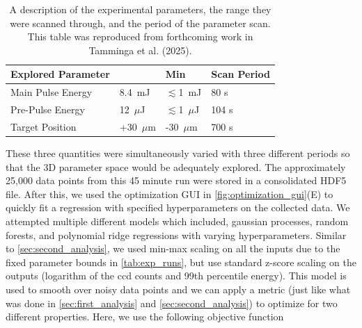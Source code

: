 \begin{table}
	\centering
	\begin{tabular}{|p{4cm}|p{1.5cm}|p{1.5cm}|p{3cm}|}
		\hline
		\textbf{Explored Parameter} & \text{Max} & \textbf{Min} & \textbf{Scan Period}\\
		\hline
		Main Pulse Energy & 8.4~mJ & $\lesssim$1~mJ & 80 s\\
		\hline
		Pre-Pulse Energy & 12~$\mu$J & $\lesssim$1~$\mu$J & 104 s\\
		\hline
		Target Position & +30~$\mu$m & -30~$\mu$m & 700 s\\
		\hline
	\end{tabular}
	\caption{A description of the experimental parameters, the range they were scanned through, and the period of the parameter scan. This table was reproduced from forthcoming work in Tamminga et al. (2025).}
	\label{tab:exp_runs}
\end{table}

These three quantities were simultaneously varied with three different periods so that the 3D parameter space would be adequately explored. The approximately 25,000 data points from this 45 minute run were stored in a consolidated \gls{HDF5} file. After this, we used the optimization \gls{GUI} in \autoref{fig:optimization_gui}(E) to quickly fit a regression with specified hyperparameters on the collected data. We attempted multiple different models which included, gaussian processes, random forests, and polynomial ridge regressions with varying hyperparameters. Similar to \autoref{sec:second_analysis}, we used min-max scaling on all the inputs due to the fixed parameter bounds in \autoref{tab:exp_runs}, but use standard z-score scaling on the outputs (logarithm of the ccd counts and 99th percentile energy). This model is used to smooth over noisy data points and we can apply a metric (just like what was done in \autoref{sec:first_analysis} and \autoref{sec:second_analysis}) to optimize for two different properties. Here, we use the following objective function


